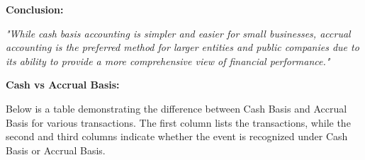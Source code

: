 \documentclass[12pt,a4paper]{book}
\begin{document}
\begin{center}
\end{center}


\vspace{0.5cm}
\textbf{Conclusion:}

\textit{"While cash basis accounting is simpler and easier for small businesses, accrual accounting is the preferred method for larger entities and public companies due to its ability to provide a more comprehensive view of financial performance."}

\vspace{0.5cm} 

\textbf{Cash vs Accrual Basis:}

Below is a table demonstrating the difference between Cash Basis and Accrual Basis for various transactions. The first column lists the transactions, while the second and third columns indicate whether the event is recognized under Cash Basis or Accrual Basis.
\end{document}
